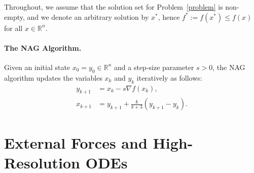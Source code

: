 \documentclass{article}
\theoremstyle{plain}
\theoremstyle{definition}
\theoremstyle{remark}
\begin{document}
Throughout, we assume that the solution set for Problem~\eqref{problem} is non-empty, and we denote an arbitrary solution by $x^*$, hence $f^* := f(x^*) \leq f(x)$ for all $x \in \mathbb{R}^n$. 

\paragraph{The NAG Algorithm.} Given an initial state $x_0 = y_0 \in \mathbb{R}^n$ and a step-size parameter $s > 0$, %
the NAG algorithm updates the variables $x_k$ and $y_k$ iteratively as follows:
\begin{equation}\label{eqn_Nest_alg}\tag{NAG}
\begin{aligned}
    y_{k+1}&=x_k -s\nabla f(x_k), \\
    x_{k+1}&= y_{k+1}+\frac{k}{k+3} (y_{k+1}-y_{k}).
\end{aligned}
\end{equation}

 
\section{External Forces and High-Resolution ODEs}\label{section2}
\end{document}
